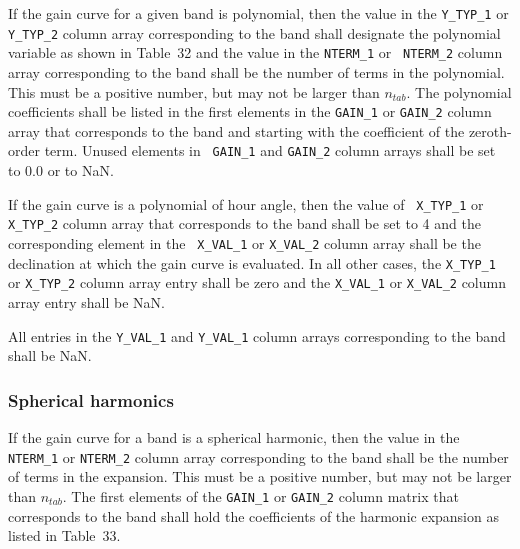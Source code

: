 \documentclass[twoside]{article}
\newcommand{\Hi}[1]{\textcolor{hicol}{#1}}
\newcommand{\ntab}{$n_{tab}$}
\begin{document}
If the gain curve for a given band is polynomial, then the value in
the {\tt Y\_TYP\_1} or  {\tt Y\_TYP\_2} column \Hi{array}
corresponding to the band shall designate the polynomial variable as
shown in Table~\Hi{32} and the value in the {\tt NTERM\_1} or {\tt
  NTERM\_2} column \Hi{array} corresponding to the band shall be the
number of terms in the polynomial.  This must be a positive number,
but may not be larger than \ntab.  The polynomial coefficients shall
be listed in the first elements in the {\tt GAIN\_1} or {\tt GAIN\_2}
column \Hi{array} that corresponds to the band and starting with the
coefficient of the zeroth-order term.  Unused elements in {\tt
  GAIN\_1} and {\tt GAIN\_2} \Hi{column arrays} shall be set to 0.0 or
to NaN.

If the gain curve is a polynomial of hour angle, then the value of {\tt
X\_TYP\_1} or {\tt X\_TYP\_2} \Hi{column array} that corresponds to
the band shall be set to 4 and the corresponding element in the {\tt
  X\_VAL\_1} or  {\tt X\_VAL\_2} \Hi{column array} shall be the
declination at which the gain curve is evaluated.  In all other cases,
the {\tt X\_TYP\_1} or {\tt X\_TYP\_2} \Hi{column array} entry shall
be zero and the {\tt X\_VAL\_1} or {\tt X\_VAL\_2} \Hi{column array}
entry shall be NaN.

All entries in the {\tt Y\_VAL\_1} and {\tt Y\_VAL\_1} \Hi{column}
arrays corresponding to the band shall be NaN.

\subsubsection{Spherical harmonics}

If the gain curve for a band is a spherical harmonic, then the value
in \Hi{the} {\tt NTERM\_1} or {\tt NTERM\_2} \Hi{column array}
corresponding to the band shall be the number of terms in the
expansion.  This must be a positive number, but may not be larger than
\ntab.  The \Hi{first elements} of the {\tt GAIN\_1} or {\tt GAIN\_2}
\Hi{column} matrix that corresponds to the band shall hold the
coefficients of the harmonic expansion as listed in Table~\Hi{33}.
\end{document}
